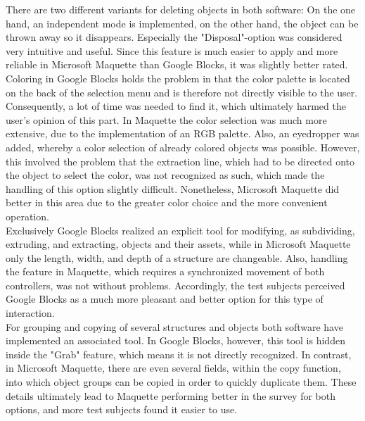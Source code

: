 \documentclass{report}
\begin{document}
			There are two different variants for deleting objects in both software: On the one hand, an independent mode is implemented, on the other hand, the object can be thrown away so it disappears. Especially the "Disposal"-option was considered very intuitive and useful. Since this feature is much easier to apply and more reliable in Microsoft Maquette than Google Blocks, it was slightly better rated. \\
			Coloring in Google Blocks holds the problem in that the color palette is located on the back of the selection menu and is therefore not directly visible to the user. Consequently, a lot of time was needed to find it, which ultimately harmed the user's opinion of this part. In Maquette the color selection was much more extensive, due to the implementation of an RGB palette. Also, an eyedropper was added, whereby a color selection of already colored objects was possible. However, this involved the problem that the extraction line, which had to be directed onto the object to select the color, was not recognized as such, which made the handling of this option slightly difficult. Nonetheless, Microsoft Maquette did better in this area due to the greater color choice and the more convenient operation. \\
			Exclusively Google Blocks realized an explicit tool for modifying, as subdividing, extruding, and extracting, objects and their assets, while in Microsoft Maquette only the length, width, and depth of a structure are changeable. Also, handling the feature in Maquette, which requires a synchronized movement of both controllers, was not without problems. Accordingly, the test subjects perceived Google Blocks as a much more pleasant and better option for this type of interaction. \\
			For grouping and copying of several structures and objects both software have implemented an associated tool. In Google Blocks, however, this tool is hidden inside the "Grab" feature, which means it is not directly recognized. In contrast, in Microsoft Maquette, there are even several fields, within the copy function, into which object groups can be copied in order to quickly duplicate them. These details ultimately lead to Maquette performing better in the survey for both options, and more test subjects found it easier to use.
		\closesection
\end{document}
